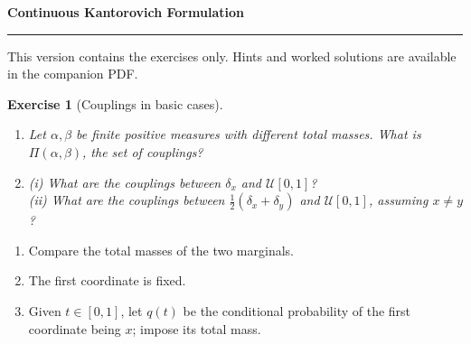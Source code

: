\documentclass[11pt,a4paper]{article}
\theoremstyle{exostyle}
\newtheorem{exercise}{Exercise}
\newif\ifcorr
\newcommand{\Unif}{\mathcal U}
\renewcommand{\maketitle}{\thispagestyle{plain}\begingroup
  \color{heading}\LARGE\bfseries\SheetTitle\par\endgroup
  \vspace{3pt}{\large\ifcorr Statements, hints and worked solutions\else Exercise statements\fi}\par
  \vspace{7pt}\hrule\vspace{9pt}
  \ifcorr Each exercise is followed by question-by-question hints and a worked solution.
  Try the questions before reading the hints.\else
  This version contains the exercises only. Hints and worked solutions are available in the companion PDF.\fi
  \par\medskip}
\newcommand{\SheetTitle}{Continuous Kantorovich Formulation}
\begin{document}
\maketitle

\begin{exercise}[Couplings in basic cases]\label{ex:simple-couplings}
\begin{enumerate}[label=(\alph*), itemsep=4pt]
\item Let $\alpha,\beta$ be finite \emph{positive} measures with \emph{different} total masses. What is $\Pi(\alpha,\beta)$, the set of couplings?
\item (i) What are the couplings between $\delta_x$ and $\Unif[0,1]$?\\
      (ii) What are the couplings between $\frac12(\delta_x+\delta_y)$ and $\Unif[0,1]$, assuming $x\ne y$?
\end{enumerate}
\end{exercise}
\begin{hints}
\begin{enumerate}[label=(\alph*)]\item Compare the total masses of the two marginals.\item[(b-i)] The first coordinate is fixed.\item[(b-ii)] Given $t\in[0,1]$, let $q(t)$ be the conditional probability of the first coordinate being $x$; impose its total mass.\end{enumerate}
\end{hints}
\end{document}
